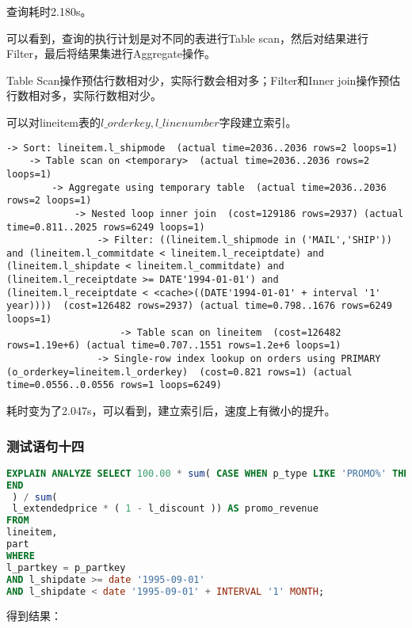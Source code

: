 \documentclass{article}
\begin{document}
查询耗时2.180s。

可以看到，查询的执行计划是对不同的表进行Table scan，然后对结果进行Filter，最后将结果集进行Aggregate操作。

Table Scan操作预估行数相对少，实际行数会相对多；Filter和Inner join操作预估行数相对多，实际行数相对少。

可以对lineitem表的$l\_orderkey,l\_linenumber$字段建立索引。

\begin{lstlisting}
-> Sort: lineitem.l_shipmode  (actual time=2036..2036 rows=2 loops=1)
    -> Table scan on <temporary>  (actual time=2036..2036 rows=2 loops=1)
        -> Aggregate using temporary table  (actual time=2036..2036 rows=2 loops=1)
            -> Nested loop inner join  (cost=129186 rows=2937) (actual time=0.811..2025 rows=6249 loops=1)
                -> Filter: ((lineitem.l_shipmode in ('MAIL','SHIP')) and (lineitem.l_commitdate < lineitem.l_receiptdate) and (lineitem.l_shipdate < lineitem.l_commitdate) and (lineitem.l_receiptdate >= DATE'1994-01-01') and (lineitem.l_receiptdate < <cache>((DATE'1994-01-01' + interval '1' year))))  (cost=126482 rows=2937) (actual time=0.798..1676 rows=6249 loops=1)
                    -> Table scan on lineitem  (cost=126482 rows=1.19e+6) (actual time=0.707..1551 rows=1.2e+6 loops=1)
                -> Single-row index lookup on orders using PRIMARY (o_orderkey=lineitem.l_orderkey)  (cost=0.821 rows=1) (actual time=0.0556..0.0556 rows=1 loops=6249)
\end{lstlisting}

耗时变为了2.047s，可以看到，建立索引后，速度上有微小的提升。

\subsubsection{测试语句十四}

\begin{lstlisting}[language=sql]
EXPLAIN ANALYZE SELECT 100.00 * sum( CASE WHEN p_type LIKE 'PROMO%' THEN l_extendedprice *( 1- l_discount ) ELSE 0 
END 
 ) / sum(
 l_extendedprice * ( 1 - l_discount )) AS promo_revenue 
FROM
lineitem,
part 
WHERE
l_partkey = p_partkey 
AND l_shipdate >= date '1995-09-01' 
AND l_shipdate < date '1995-09-01' + INTERVAL '1' MONTH;
\end{lstlisting}

得到结果：
\end{document}
